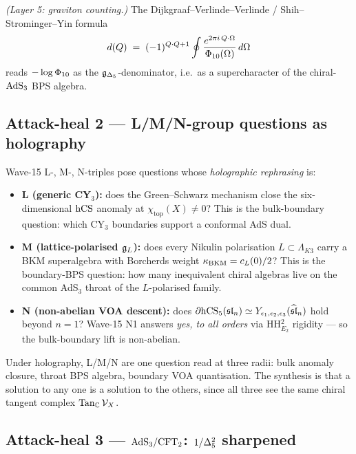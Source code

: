 \ClaimStatusTheorem{} \emph{(Layer 5: graviton counting.)} The
Dijkgraaf--Verlinde--Verlinde / Shih--Strominger--Yin formula
\[
  d(Q)\;=\;(-1)^{Q\cdot Q+1}\oint
  \frac{e^{2\pi i\,Q\cdot\Omega}}{\Phi_{10}(\Omega)}\,d\Omega
\]
reads $-\log\Phi_{10}$ as the $\mathfrak{g}_{\Delta_5}$-denominator, i.e.\ as a supercharacter
of the chiral-$\mathrm{AdS}_3$ BPS algebra.

\subsection*{Attack-heal 2 --- L/M/N-group questions as holography}

Wave-15 L-, M-, N-triples pose questions whose \emph{holographic
rephrasing} is:
\begin{itemize}
  \item \textbf{L (generic CY$_3$):} does the Green--Schwarz
    mechanism close the six-dimensional $\mathrm{hCS}$ anomaly at
    $\chi_{\mathrm{top}}(X)\ne 0$?  This is the bulk-boundary
    question: which CY$_3$ boundaries support a conformal AdS dual.
  \item \textbf{M (lattice-polarised $\mathfrak{g}_{L}$):} does every Nikulin
    polarisation $L\subset\Lambda_{K3}$ carry a BKM
    superalgebra with Borcherds weight $\kappa_{\mathrm{BKM}}=c_L(0)/2$?  This is
    the boundary-BPS question: how many inequivalent chiral
    algebras live on the common AdS$_3$ throat of the $L$-polarised
    family.
  \item \textbf{N (non-abelian VOA descent):} does
    $\partial\mathrm{hCS}_5(\mathfrak{sl}_n)\simeq Y_{\epsilon_1,\epsilon_2,\epsilon_3}(\widehat{\mathfrak{sl}}_n)$ hold beyond
    $n=1$?  Wave-15 N1 answers \emph{yes, to all orders} via HH$^2_{E_2}$
    rigidity --- so the bulk-boundary lift is non-abelian.
\end{itemize}
Under holography, L/M/N are one question read at three radii: bulk
anomaly closure, throat BPS algebra, boundary VOA quantisation.  The
synthesis is that a solution to any one is a solution to the others,
since all three see the same chiral tangent complex
$\mathrm{Tan}_{\mathbb{C}}\,\mathcal{V}_X$.

\subsection*{Attack-heal 3 --- $\mathrm{AdS}_3/\mathrm{CFT}_2$: $1/\Delta_{5}^2$
  sharpened}

